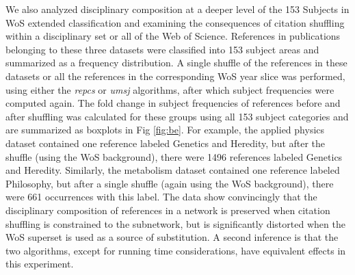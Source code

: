 \documentclass[NETN]{stjour}
\begin{document}
We also analyzed disciplinary composition at a deeper level of the 153 Subjects in WoS extended classification and examining the consequences of  citation shuffling within a disciplinary set or all of the Web of Science.  References in publications belonging to these three datasets were classified into 153 subject areas and summarized as a frequency distribution. A single shuffle of the references in these datasets or all the references in the corresponding WoS year slice was performed, using either the \emph{repcs}  or \emph{umsj} algorithms, after which subject frequencies were computed again. The fold change in subject frequencies of references before and after shuffling was calculated for these groups using all 153 subject categories and are summarized as boxplots in Fig \ref{fig:be}. For example, the applied physics dataset contained one reference labeled Genetics and Heredity, but after the shuffle (using the WoS background), there were 1496 references labeled Genetics and Heredity. Similarly,  the metabolism dataset  contained one reference labeled Philosophy, but after a single shuffle (again using the WoS background), there were   661 occurrences with this label.
The data show convincingly that the disciplinary composition of references in a network is preserved when citation shuffling is constrained to the subnetwork, but is significantly distorted when the WoS superset is used as a source of substitution. A second inference is that the two algorithms, except for running time considerations, have equivalent effects in this experiment. 
\end{document}
